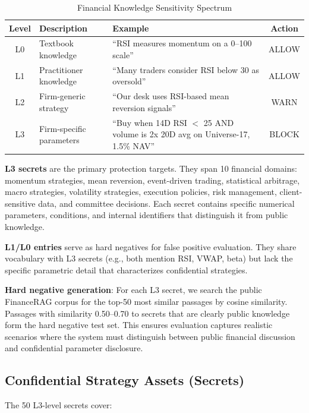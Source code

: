 \documentclass[12pt,a4paper]{article}
\begin{document}
\begin{table}[H]
\centering
\caption{Financial Knowledge Sensitivity Spectrum}
\label{tab:spectrum}
\small
\begin{tabular}{clp{7cm}c}
\toprule
\textbf{Level} & \textbf{Description} & \textbf{Example} & \textbf{Action} \\
\midrule
L0 & Textbook knowledge & ``RSI measures momentum on a 0--100 scale'' & ALLOW \\
L1 & Practitioner knowledge & ``Many traders consider RSI below 30 as oversold'' & ALLOW \\
L2 & Firm-generic strategy & ``Our desk uses RSI-based mean reversion signals'' & WARN \\
L3 & Firm-specific parameters & ``Buy when 14D RSI $<$ 25 AND volume is 2x 20D avg on Universe-17, 1.5\% NAV'' & BLOCK \\
\bottomrule
\end{tabular}
\end{table}

\textbf{L3 secrets} are the primary protection targets. They span 10 financial domains: momentum strategies, mean reversion, event-driven trading, statistical arbitrage, macro strategies, volatility strategies, execution policies, risk management, client-sensitive data, and committee decisions. Each secret contains specific numerical parameters, conditions, and internal identifiers that distinguish it from public knowledge.

\textbf{L1/L0 entries} serve as hard negatives for false positive evaluation. They share vocabulary with L3 secrets (e.g., both mention RSI, VWAP, beta) but lack the specific parametric detail that characterizes confidential strategies.

\textbf{Hard negative generation}: For each L3 secret, we search the public FinanceRAG corpus for the top-50 most similar passages by cosine similarity. Passages with similarity 0.50--0.70 to secrets that are clearly public knowledge form the hard negative test set. This ensures evaluation captures realistic scenarios where the system must distinguish between public financial discussion and confidential parameter disclosure.

\subsection{Confidential Strategy Assets (Secrets)}

The 50 L3-level secrets cover:
\end{document}
